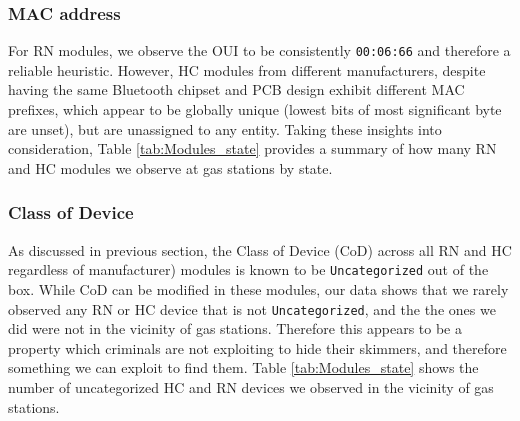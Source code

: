 \subsubsection {MAC address}

For RN modules, we observe the OUI to be consistently \texttt{00:06:66} and therefore a reliable heuristic. However, HC modules from different manufacturers, despite having the same Bluetooth chipset and PCB design exhibit different MAC prefixes, which appear to be globally unique (lowest bits of most significant byte are unset)\cite{OUIguidelines}, but are unassigned to any entity. Taking these insights into consideration, Table \ref{tab:Modules_state} provides a summary of how many RN and HC modules we observe at gas stations by state.

\begin{table}
\centering
\scriptsize
{}
\caption{Different MAC ranges observed for HC modules purchased from different sources}
\label{tab:ModuleB_MAC}
\end{table}

\begin{table}[]
\centering
\scriptsize
{}
\caption{Distribution of Bluetooth modules observed per state}
\label{tab:MAC_state}
\end{table}

\subsubsection{Class of Device}

As discussed in previous section, the Class of Device (CoD) across all RN and HC regardless of manufacturer) modules is known to be \texttt{Uncategorized} out of the box. While CoD can be modified in these modules, our data shows that we rarely observed any RN or HC device that is not \texttt{Uncategorized}, and the the ones we did were not in the vicinity of gas stations. Therefore this appears to be a property which criminals are not exploiting to hide their skimmers, and therefore something we can exploit to find them. Table \ref{tab:Modules_state} shows the number of uncategorized HC and RN devices we observed in the vicinity of gas stations.



